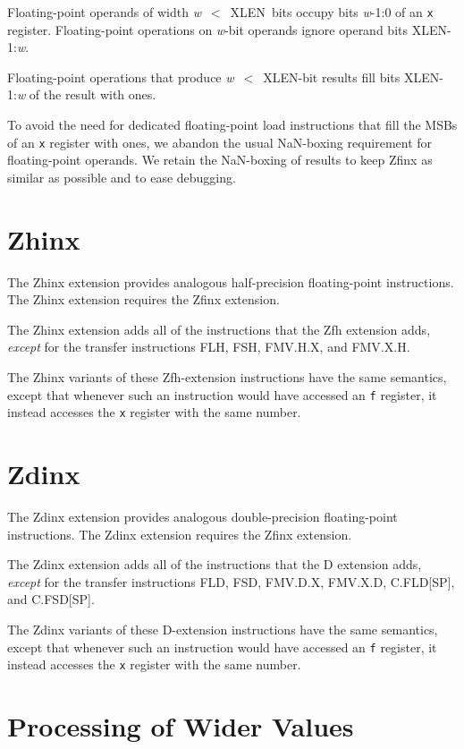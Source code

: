 Floating-point operands of width \mbox{{\em w} $<$ XLEN bits} occupy bits
\mbox{{\em w}-1:0} of an {\tt x} register.
Floating-point operations on {\em w}-bit operands ignore operand bits
\mbox{XLEN-1:{\em w}}.

Floating-point operations that produce \mbox{{\em w} $<$ XLEN-bit} results
fill bits \mbox{XLEN-1:{\em w}} of the result with ones.

\begin{commentary}
To avoid the need for dedicated floating-point load instructions that fill the
MSBs of an {\tt x} register with ones, we abandon the usual NaN-boxing
requirement for floating-point operands.
We retain the NaN-boxing of results to keep Zfinx as similar as possible and
to ease debugging.
\end{commentary}

\section{Zhinx}

The Zhinx extension provides analogous half-precision floating-point
instructions.
The Zhinx extension requires the Zfinx extension.

The Zhinx extension adds all of the instructions that the Zfh extension
adds, {\em except} for the transfer instructions FLH, FSH, FMV.H.X,
and FMV.X.H.

The Zhinx variants of these Zfh-extension instructions have the same semantics,
except that whenever such an instruction would have accessed an {\tt f}
register, it instead accesses the {\tt x} register with the same number.

\section{Zdinx}

The Zdinx extension provides analogous double-precision floating-point
instructions.
The Zdinx extension requires the Zfinx extension.

The Zdinx extension adds all of the instructions that the D extension
adds, {\em except} for the transfer instructions FLD, FSD, FMV.D.X,
FMV.X.D, C.FLD[SP], and C.FSD[SP].

The Zdinx variants of these D-extension instructions have the same semantics,
except that whenever such an instruction would have accessed an {\tt f}
register, it instead accesses the {\tt x} register with the same number.

\section{Processing of Wider Values}

